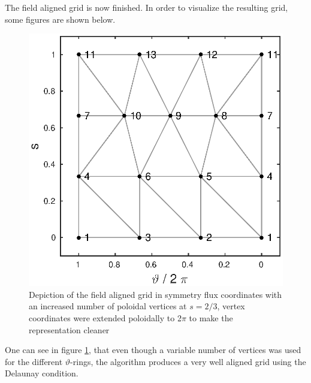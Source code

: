 \documentclass[./main.tex]{subfiles}
\begin{document}
The field aligned grid is now finished. In order to visualize the resulting grid, some figures are shown below.
\newpage
\begin{figure}[!ht]
	\includegraphics[width=1\textwidth]{figures/Delaunay_Connected_PrismFaces.eps}
	\caption{Depiction of the field aligned grid in symmetry flux coordinates with an increased number of poloidal vertices at $s=2/3$, vertex coordinates were extended poloidally to 2$\pi$ to make the representation cleaner}
	\label{fig:Delaunay_Connected_Faces}
\end{figure}

One can see in figure \ref{fig:Delaunay_Connected_Faces}, that even though a variable number of vertices was used for the different $\vartheta$-rings, the algorithm produces a very well aligned grid using the Delaunay condition.
\end{document}
